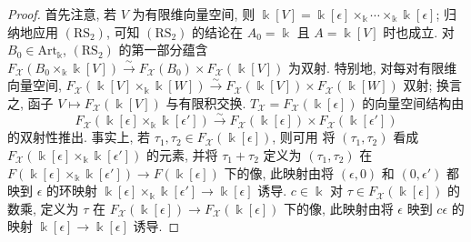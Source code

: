 \begin{proof}
首先注意, 若 $V$ 为有限维向量空间, 则 $\Bbbk[V]=\Bbbk[\epsilon]\times_{\Bbbk}\cdots\times_{\Bbbk}\Bbbk[\epsilon]$; 归纳地应用 $(\mathrm{RS}_2)$, 可知 $(\mathrm{RS}_2)$ 的结论在 $A_0=\Bbbk$ 且 $A=\Bbbk[V]$ 时也成立. 对 $B_0\in\mathrm{Art}_{\Bbbk}$, $(\mathrm{RS}_2)$ 的第一部分蕴含 $F_{\mathcal X}(B_0\times_{\Bbbk}\Bbbk[V])\xrightarrow{\sim}F_{\mathcal X}(B_0)\times F_{\mathcal X}(\Bbbk[V])$ 为双射. 特别地, 对每对有限维向量空间, $F_{\mathcal X}(\Bbbk[V]\times_{\Bbbk}\Bbbk[W])\xrightarrow{\sim}F_{\mathcal X}(\Bbbk[V])\times F_{\mathcal X}(\Bbbk[W])$ 双射; 换言之, 函子 $V\mapsto F_{\mathcal X}(\Bbbk[V])$ 与有限积交换. $T_{\mathcal X}=F_{\mathcal X}(\Bbbk[\epsilon])$ 的向量空间结构由
\begin{equation}\label{src:C.4.10}
F_{\mathcal X}(\Bbbk[\epsilon]\times_{\Bbbk}\Bbbk[\epsilon'])\xrightarrow{\sim}F_{\mathcal X}(\Bbbk[\epsilon])\times F_{\mathcal X}(\Bbbk[\epsilon'])
\end{equation}
的双射性推出. 事实上, 若 $\tau_1,\tau_2\in F_{\mathcal X}(\Bbbk[\epsilon])$, 则可用  将 $(\tau_1,\tau_2)$ 看成 $F_{\mathcal X}(\Bbbk[\epsilon]\times_{\Bbbk}\Bbbk[\epsilon'])$ 的元素, 并将 $\tau_1+\tau_2$ 定义为 $(\tau_1,\tau_2)$ 在 $F(\Bbbk[\epsilon]\times_{\Bbbk}\Bbbk[\epsilon'])\to F(\Bbbk[\epsilon])$ 下的像, 此映射由将 $(\epsilon,0)$ 和 $(0,\epsilon')$ 都映到 $\epsilon$ 的环映射 $\Bbbk[\epsilon]\times_{\Bbbk}\Bbbk[\epsilon']\to\Bbbk[\epsilon]$ 诱导. $c\in\Bbbk$ 对 $\tau\in F_{\mathcal X}(\Bbbk[\epsilon])$ 的数乘, 定义为 $\tau$ 在 $F_{\mathcal X}(\Bbbk[\epsilon])\to F_{\mathcal X}(\Bbbk[\epsilon])$ 下的像, 此映射由将 $\epsilon$ 映到 $c\epsilon$ 的映射 $\Bbbk[\epsilon]\to\Bbbk[\epsilon]$ 诱导.


\end{proof}
